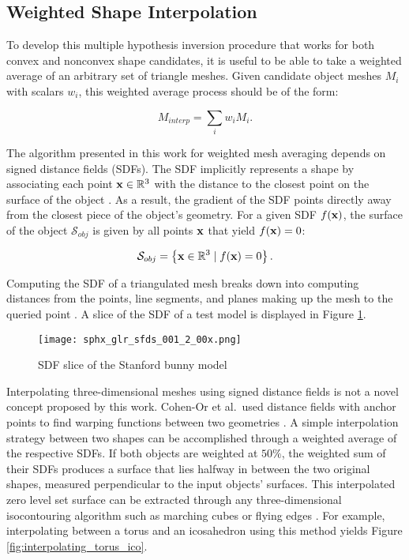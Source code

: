 \subsection{Weighted Shape Interpolation}

To develop this multiple hypothesis inversion procedure that works for both convex and nonconvex shape candidates, it is useful to be able to take a weighted average of an arbitrary set of triangle meshes. Given candidate object meshes $M_i$ with scalars $w_i$, this weighted average process should be of the form:

\begin{equation}
  M_{interp} = \sum_{i}{w_i M_i}.
\end{equation}

The algorithm presented in this work for weighted mesh averaging depends on signed distance fields (SDFs). The SDF implicitly represents a shape by associating each point $\mathbf{x} \in \mathbb{R}^3$ with the distance to the closest point on the surface of the object \cite{baerentzen2002}. As a result, the gradient of the SDF points directly away from the closest piece of the object's geometry. For a given SDF $f(\mathbf{x})$, the surface of the object $\mathcal{S}_{obj}$ is given by all points $\mathbf{x}$ that yield $f(\mathbf{x}) = 0$:

\begin{equation} \label{eq:sdf_zero_level_set}
  \mathcal{S}_{obj} = \left\{ \mathbf{x} \in \mathbb{R}^3 \mid f(\mathbf{x}) = 0 \right\}.
\end{equation}

Computing the SDF of a triangulated mesh breaks down into computing distances from the points, line segments, and planes making up the mesh to the queried point \cite{baerentzen2002}. A slice of the SDF of a test model is displayed in Figure \ref{fig:sdf_slice}.

\graphicspath{{/Users/liamrobinson/Documents/PyLightCurves/docs/build/html/_images}}
\begin{figure}[!htb]
  \centering
  \texttt{[image: sphx\_glr\_sfds\_001\_2\_00x.png]}
  \caption{SDF slice of the Stanford bunny model}
  \label{fig:sdf_slice}
\end{figure}

Interpolating three-dimensional meshes using signed distance fields is not a novel concept proposed by this work. Cohen-Or et al.\ used distance fields with anchor points to find warping functions between two geometries \cite{cohen_or1998}. A simple interpolation strategy between two shapes can be accomplished through a weighted average of the respective SDFs. If both objects are weighted at $50\%$, the weighted sum of their SDFs produces a surface that lies halfway in between the two original shapes, measured perpendicular to the input objects' surfaces. This interpolated zero level set surface can be extracted through any three-dimensional isocontouring algorithm such as marching cubes \cite{lorensen1987} or flying edges \cite{schroeder2015}. For example, interpolating between a torus and an icosahedron using this method yields Figure \ref{fig:interpolating_torus_ico}. 

